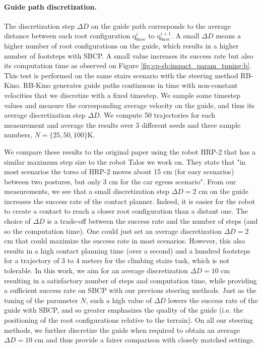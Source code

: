 \paragraph{Guide path discretization.}
The discretization step $\Delta D$ on the guide path corresponds to the average distance between each root configuration q$_{base}^i$ to q$_{base}^{i+1}$. A small $\Delta D$ means a higher number of root configurations on the guide, which results in a higher number of footsteps with SBCP. 
A small value increases its success rate but also its computation time as observed on Figure \ref{fig:cp-sb:impact_param_tuning:b}.
This test is performed on the same stairs scenario with the steering method RB-Kino. 
RB-Kino generates guide paths continuous in time with non-constant velocities that
we discretize with a fixed timestep. 
We sample some timestep values and measure the corresponding average velocity on the guide, and thus its average discretization step $\Delta D$.
We compute 50 trajectories for each measurement and average the results over 3 different seeds and three sample numbers, $N=\{25,50,100\}$K. 

We compare these results to the original paper \cite{AcyclicCP} using the robot HRP-2 that has a similar maximum step size to the robot Talos we work on. They state that "in most scenarios the torso of HRP-2 moves about 15 cm (for easy scenarios) between two postures, but only 3 cm for the car egress scenario". 
From our measurements, we see that a small discretization step $\Delta D=2$ cm on the guide increases the success rate of the contact planner. 
Indeed, it is easier for the robot to create a contact to reach a closer root configuration than a distant one.
The choice of $\Delta D$ is a trade-off between the success rate and the number of steps (and so the computation time). 
One could just set an average discretization $\Delta D=2$ cm that could maximize the success rate in most scenarios. However, this also results in a high contact planning time (over a second) and a hundred footsteps for a trajectory of $3$ to $4$ meters for the climbing stairs task, which is not tolerable.
In this work, we aim for an average discretization $\Delta D=10$ cm resulting in a satisfactory number of steps and computation time, while providing a sufficient success rate on SBCP with our previous steering methods. 
Just as the tuning of the parameter $N$, such a high value of $\Delta D$ lowers the success rate of the guide with SBCP, and so greater emphasizes the quality of the guide (i.e. the positioning of the root configurations relative to the terrain).
On all our steering methods, we further discretize the guide when required to obtain an average $\Delta D=10$ cm and thus provide a fairer comparison with closely matched settings.


